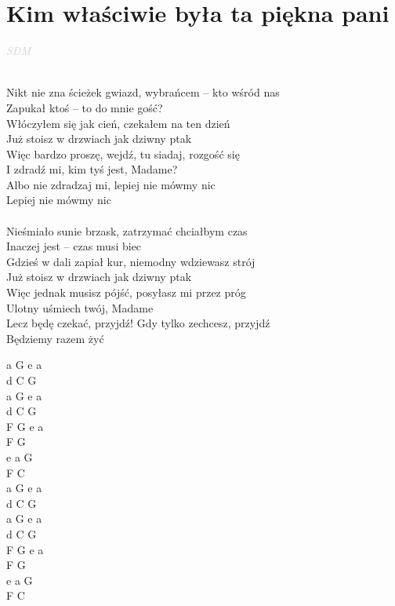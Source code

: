 \documentclass[a5paper, 10pt]{book}
\begin{document}
\newpage
\section{Kim właściwie była ta piękna pani}\textcolor{lightgray}{\textit{SDM}}\\~\\
\begin{minipage}[t]{0.8\textwidth}
Nikt nie zna ścieżek gwiazd, wybrańcem – kto wśród nas\\
Zapukał ktoś – to do mnie gość?\\
Włóczyłem się jak cień, czekałem na ten dzień\\
Już stoisz w drzwiach jak dziwny ptak\\
\hspace*{5mm} Więc bardzo proszę, wejdź, tu siadaj, rozgość się\\
\hspace*{5mm} I zdradź mi, kim tyś jest, Madame?\\
\hspace*{5mm} Albo nie zdradzaj mi, lepiej nie mówmy nic\\
\hspace*{5mm} Lepiej nie mówmy nic\\
\\
Nieśmiało sunie brzask, zatrzymać chciałbym czas\\
Inaczej jest – czas musi biec\\
Gdzieś w dali zapiał kur, niemodny wdziewasz strój\\
Już stoisz w drzwiach jak dziwny ptak\\
\hspace*{5mm}Więc jednak musisz pójść, posyłasz mi przez próg\\
\hspace*{5mm}Ulotny uśmiech twój, Madame\\
\hspace*{5mm}Lecz będę czekać, przyjdź! Gdy tylko zechcesz, przyjdź\\
\hspace*{5mm}Będziemy razem żyć\\

\end{minipage}
\begin{minipage}[t]{0.2\textwidth}
a G e a\\
d C G \\
a G e a\\
d C G \\
F G e a\\
F G \\
 e a G \\
F C \\

a G e a\\
d C G \\
a G e a\\
d C G \\
F G e a\\
F G \\
e a G \\
F C \\
 \end{minipage}
\end{document}
